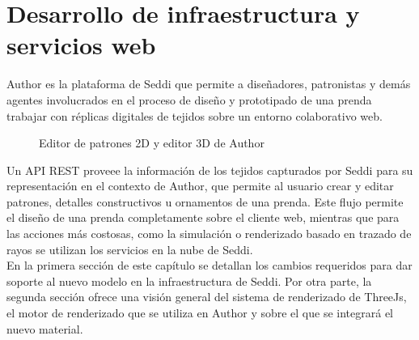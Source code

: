 \chapter{Desarrollo de infraestructura y servicios web}
Author es la plataforma de Seddi que permite a dise\~nadores, patronistas y dem\'as agentes involucrados en el proceso
de dise\~no y prototipado de una prenda trabajar con r\'eplicas digitales de tejidos sobre un entorno colaborativo web.

\begin{figure}[H]
  \vspace{0.5cm}
  \centering
  \caption{Editor de patrones 2D y editor 3D de Author}
  \vspace{0.5cm}
\end{figure}

Un API REST proveee la informaci\'on de los tejidos capturados por Seddi para su representaci\'on en el contexto de Author,
que permite al usuario crear y editar patrones, detalles constructivos u ornamentos de una prenda. Este flujo permite
el dise\~no de una prenda completamente sobre el cliente web, mientras que para las acciones m\'as costosas, como la simulaci\'on
o renderizado basado en trazado de rayos se utilizan los servicios en la nube de Seddi.\\

En la primera secci\'on de este cap\'itulo se detallan los cambios requeridos para dar soporte al nuevo modelo en la infraestructura
de Seddi. Por otra parte, la segunda secci\'on ofrece una visi\'on general del sistema de renderizado de ThreeJs, el motor de
renderizado que se utiliza en Author y sobre el que se integrar\'a el nuevo material.



